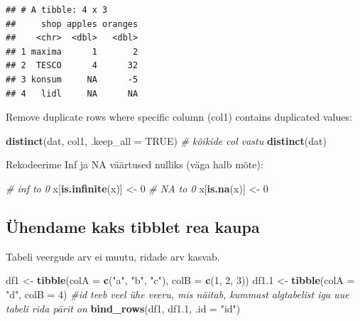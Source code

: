 \documentclass[]{book}
\newenvironment{Shaded}{\begin{snugshade}}{\end{snugshade}}
\newcommand{\KeywordTok}[1]{\textcolor[rgb]{0.13,0.29,0.53}{\textbf{#1}}}
\newcommand{\DataTypeTok}[1]{\textcolor[rgb]{0.13,0.29,0.53}{#1}}
\newcommand{\DecValTok}[1]{\textcolor[rgb]{0.00,0.00,0.81}{#1}}
\newcommand{\StringTok}[1]{\textcolor[rgb]{0.31,0.60,0.02}{#1}}
\newcommand{\CommentTok}[1]{\textcolor[rgb]{0.56,0.35,0.01}{\textit{#1}}}
\newcommand{\OtherTok}[1]{\textcolor[rgb]{0.56,0.35,0.01}{#1}}
\newcommand{\OperatorTok}[1]{\textcolor[rgb]{0.81,0.36,0.00}{\textbf{#1}}}
\newcommand{\NormalTok}[1]{#1}
\begin{document}
\begin{Shaded}
\end{Shaded}

\begin{verbatim}
## # A tibble: 4 x 3
##     shop apples oranges
##    <chr>  <dbl>   <dbl>
## 1 maxima      1       2
## 2  TESCO      4      32
## 3 konsum     NA      -5
## 4   lidl     NA      NA
\end{verbatim}

Remove duplicate rows where specific column (col1) contains duplicated
values:

\begin{Shaded}
\begin{Highlighting}[]
\KeywordTok{distinct}\NormalTok{(dat, col1, }\DataTypeTok{.keep_all =} \OtherTok{TRUE}\NormalTok{)}
\CommentTok{# kõikide col vastu}
\KeywordTok{distinct}\NormalTok{(dat) }
\end{Highlighting}
\end{Shaded}

Rekodeerime Inf ja NA väärtused nulliks (väga halb mõte):

\begin{Shaded}
\begin{Highlighting}[]
\CommentTok{# inf to 0}
\NormalTok{x[}\KeywordTok{is.infinite}\NormalTok{(x)] <-}\StringTok{ }\DecValTok{0}
\CommentTok{# NA to 0}
\NormalTok{x[}\KeywordTok{is.na}\NormalTok{(x)] <-}\StringTok{ }\DecValTok{0}
\end{Highlighting}
\end{Shaded}

\subsection{Ühendame kaks tibblet rea
kaupa}\label{uhendame-kaks-tibblet-rea-kaupa}

Tabeli veergude arv ei muutu, ridade arv kasvab.

\begin{Shaded}
\begin{Highlighting}[]
\NormalTok{df1 <-}\StringTok{ }\KeywordTok{tibble}\NormalTok{(}\DataTypeTok{colA =} \KeywordTok{c}\NormalTok{(}\StringTok{"a"}\NormalTok{, }\StringTok{"b"}\NormalTok{, }\StringTok{"c"}\NormalTok{), }\DataTypeTok{colB =} \KeywordTok{c}\NormalTok{(}\DecValTok{1}\NormalTok{, }\DecValTok{2}\NormalTok{, }\DecValTok{3}\NormalTok{))}
\NormalTok{df1.}\DecValTok{1}\NormalTok{ <-}\StringTok{ }\KeywordTok{tibble}\NormalTok{(}\DataTypeTok{colA =} \StringTok{"d"}\NormalTok{, }\DataTypeTok{colB =}  \DecValTok{4}\NormalTok{)}
\CommentTok{#id teeb veel ühe veeru, mis näitab, kummast algtabelist iga uue tabeli rida pärit on }
\KeywordTok{bind_rows}\NormalTok{(df1, df1.}\DecValTok{1}\NormalTok{, }\DataTypeTok{.id =} \StringTok{"id"}\NormalTok{)}
\end{Highlighting}
\end{Shaded}
\end{document}
